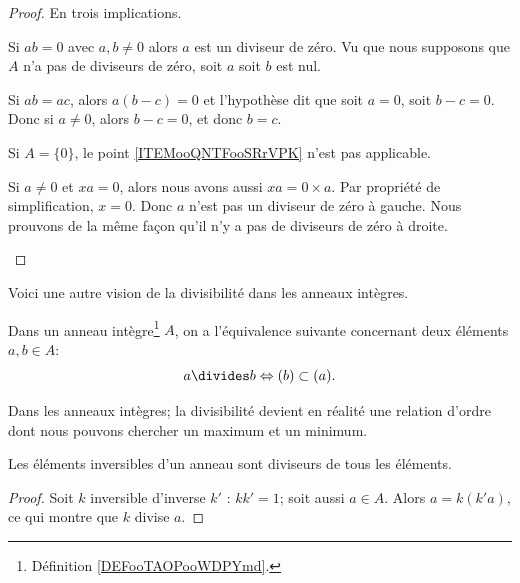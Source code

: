 \begin{proof}
    En trois implications.
    \begin{subproof}
        \item[\ref{ITEMooMXMKooXMYpkN} implique \ref{ITEMooLAJCooFwxXrV}]

            Si \( ab=0\) avec \( a,b\neq 0\) alors \( a\) est un diviseur de zéro. Vu que nous supposons que \( A\) n'a pas de diviseurs de zéro, soit \( a\) soit \( b\) est nul.
        \item[\ref{ITEMooLAJCooFwxXrV} implique \ref{ITEMooQNTFooSRrVPK}]

            Si \( ab=ac\), alors \( a(b-c)=0\) et l'hypothèse dit que soit \( a=0\), soit \( b-c=0\). Donc si \( a\neq 0\), alors \( b-c=0\), et donc \( b = c \).
        \item[\ref{ITEMooQNTFooSRrVPK} implique \ref{ITEMooMXMKooXMYpkN}]
            Si \( A=\{ 0 \}\), le point \ref{ITEMooQNTFooSRrVPK} n'est pas applicable.

            Si \( a\neq 0\) et \( xa=0\), alors nous avons aussi \( xa=0\times a\). Par propriété de simplification, \( x=0\). Donc \( a\) n'est pas un diviseur de zéro à gauche. Nous prouvons de la même façon qu'il n'y a pas de diviseurs de zéro à droite.
    \end{subproof}
\end{proof}

Voici une autre vision de la divisibilité dans les anneaux intègres.
\begin{proposition}\label{PropDiviseurIdeaux}
    Dans un anneau intègre\footnote{Définition \ref{DEFooTAOPooWDPYmd}.} $A$, on a l'équivalence suivante concernant deux éléments \( a, b \in A \):
\begin{equation}
    a\divides b\Leftrightarrow (b)\subset (a).
\end{equation}
\end{proposition}

Dans les anneaux intègres; la divisibilité devient en réalité une relation d'ordre dont nous pouvons chercher un maximum et un minimum.

\begin{lemma}
    Les éléments inversibles d'un anneau sont diviseurs de tous les éléments.
\end{lemma}

\begin{proof}
    Soit \( k\) inversible d'inverse \( k'\) : \( kk'=1\); soit aussi \( a\in A\). Alors \( a=k(k'a)\), ce qui montre que \( k\) divise \( a\).
\end{proof}

